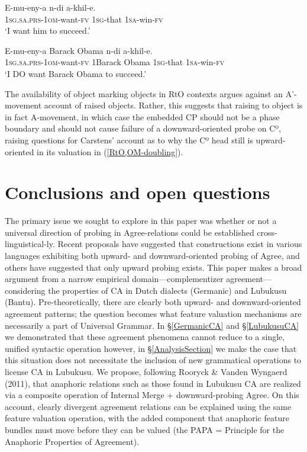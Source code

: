 \documentclass[output=paper
,modfonts
,nonflat
]{langsci/langscibook}
\begin{document}
\begin{xlist}

\ex \label{OMedRtOObject}
\gll E-mu-eny-a n-di a-khil-e. \\
1\textsc{sg}.\textsc{sa}.\textsc{prs}-1\textsc{om}-want-\textsc{fv} 1\textsc{sg}-that 1\textsc{sa}-win-\textsc{fv}\\
\glt `I want him to succeed.'

\ex \label{RtO,OM-doubling}
\gll E-mu-eny-a Barack Obama n-di a-khil-e.\\
1\textsc{sg}.\textsc{sa}.\textsc{prs}-1\textsc{om}-want-\textsc{fv} 1Barack Obama 1\textsc{sg}-that 1\textsc{sa}-win-\textsc{fv} \\
\glt `I DO want Barack Obama to succeed.'

\end{xlist}
\z
\noindent The availability of object marking objects in RtO contexts argues against an A’-movement account of raised objects. Rather, this suggests that raising to object is in fact A-movement, in which case the embedded CP should not be a phase boundary and should not cause failure of a downward-oriented probe on Cº, raising questions for Carstens’ account as to why the Cº head still is upward-oriented in its valuation in (\ref{RtO,OM-doubling}).

\section{Conclusions and open questions}

The primary issue we sought to explore in this paper was whether or not a universal direction of probing in Agree-relations could be established cross-linguistical-\newline ly. Recent proposals have suggested that constructions exist in various languages exhibiting both upward- and downward-oriented probing of Agree, and others have suggested that only upward probing exists. This paper makes a broad argument from a narrow empirical domain—complementizer agreement—considering the properties of CA in Dutch dialects (Germanic) and Lubukusu (Bantu). Pre-theoretically, there are clearly both upward- and downward-oriented agreement patterns; the question becomes what feature valuation mechanisms are necessarily a part of Universal Grammar. In \S \ref{GermanicCA} and \S \ref{LubukusuCA} we demonstrated that these agreement phenomena cannot reduce to a single, unified syntactic operation  however, in \S \ref{AnalysisSection} we make the case that this situation does not necessitate the inclusion of new grammatical operations to license CA in Lubukusu. We propose, following Rooryck \& Vanden Wyngaerd (2011), that anaphoric relations such as those found in Lubukusu CA are realized via a composite operation of Internal Merge + downward-probing Agree. On this account, clearly divergent agreement relations can be explained using the same feature valuation operation, with the added component that anaphoric feature bundles must move before they can be valued (the PAPA = Principle for the Anaphoric Properties of Agreement). 
\end{document}
